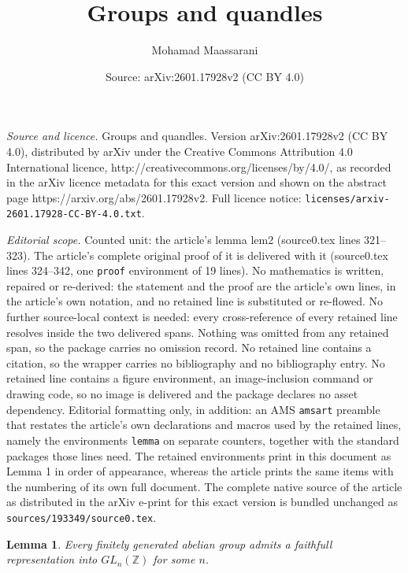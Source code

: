 \documentclass[10pt,a4paper]{amsart}
\title{Groups and quandles}
\author{Mohamad Maassarani}
\date{Source: arXiv:2601.17928v2 (CC BY 4.0)}
\newtheorem{lemma}{Lemma}
\newcommand{\Z}{ {\mathbb Z} }
\begin{document}
\maketitle

\noindent\emph{Source and licence.} Groups and quandles. Version arXiv:2601.17928v2 (CC BY 4.0), distributed by arXiv under the Creative Commons Attribution 4.0 International licence, http://creativecommons.org/licenses/by/4.0/, as recorded in the arXiv licence metadata for this exact version and shown on the abstract page https://arxiv.org/abs/2601.17928v2. Full licence notice: \texttt{licenses/arxiv-2601.17928-CC-BY-4.0.txt}.\par\smallskip

\noindent\textit{Editorial scope.} Counted unit: the article's lemma lem2 (source0.tex lines 321--323). The article's complete original proof of it is delivered with it (source0.tex lines 324--342, one \texttt{proof} environment of 19 lines). No mathematics is written, repaired or re-derived: the statement and the proof are the article's own lines, in the article's own notation, and no retained line is substituted or re-flowed.  No further source-local context is needed: every cross-reference of every retained line resolves inside the two delivered spans.  Nothing was omitted from any retained span, so the package carries no omission record.  No retained line contains a citation, so the wrapper carries no bibliography and no bibliography entry.  No retained line contains a figure environment, an image-inclusion command or drawing code, so no image is delivered and the package declares no asset dependency.  Editorial formatting only, in addition: an AMS \texttt{amsart} preamble that restates the article's own declarations and macros used by the retained lines, namely the environments \texttt{lemma} on separate counters, together with the standard packages those lines need.  The retained environments print in this document as Lemma 1 in order of appearance, whereas the article prints the same items with the numbering of its own full document.  The complete native source of the article as distributed in the arXiv e-print for this exact version is bundled unchanged as \texttt{sources/193349/source0.tex}.
\begin{lemma}\label{lem2}
Every finitely generated abelian group admits a faithfull representation into $GL_n(\Z)$ for some $n$.
\end{lemma}
\end{document}
